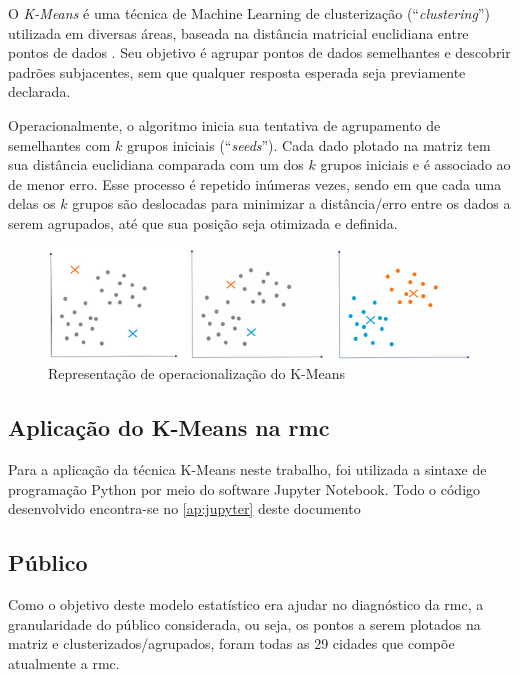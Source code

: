 	O \textit{K-Means} é uma técnica de Machine Learning de clusterização (``\textit{clustering}'') utilizada em diversas áreas, baseada na distância matricial euclidiana entre pontos de dados \cite{hartigan1979a}. Seu objetivo é agrupar pontos de dados semelhantes e descobrir padrões subjacentes, sem que qualquer resposta esperada seja previamente declarada.
	
	Operacionalmente, o algoritmo inicia sua tentativa de agrupamento de semelhantes com $k$ grupos iniciais (``\textit{seeds}''). Cada dado plotado na matriz tem sua distância euclidiana comparada com um dos $k$ grupos iniciais e é associado ao de menor erro. Esse processo é repetido inúmeras vezes, sendo em que cada uma delas os $k$ grupos são deslocadas para minimizar a distância/erro entre os dados a serem agrupados, até que sua posição seja otimizada e definida. 

	\begin{figure}
		\centering
		\caption{Representação de operacionalização do K-Means}
		\label{fig:kmeans}
		\includegraphics[width=1\linewidth]{img/machine_A}
	\end{figure}

	\subsection{Aplicação do K-Means na \gls{rmc}}
	
	Para a aplicação da técnica K-Means neste trabalho, foi utilizada a sintaxe de programação Python por meio do software Jupyter Notebook. Todo o código desenvolvido encontra-se no \autoref{ap:jupyter} deste documento
	
	\subsection{Público}
	Como o objetivo deste modelo estatístico era ajudar no diagnóstico da \glsdesc{rmc}, a granularidade do público considerada, ou seja, os pontos a serem plotados na matriz e clusterizados/agrupados, foram todas as 29 cidades que compõe atualmente a \gls{rmc}.
	
